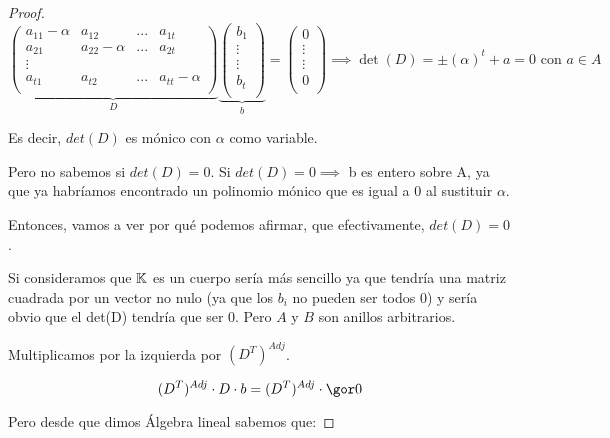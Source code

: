 \begin{proof}
	\[
	\underbrace{
	\left( \begin{array}{cccc}
	a_{11}-\alpha & a_{12} & ... & a_{1t} \\
	a_{21} & a_{22} -\alpha & ... & a_{2t} \\
	\vdots & & & \\
	a_{t1} & a_{t2}& ... & a_{tt} - \alpha \\
	\end{array}
	\right)}_{D}
	\underbrace{
	\left( \begin{array}{c}
	b_1 \\
	\vdots \\
	\vdots \\
	b_t\\
	\end{array}
	\right)}_{b} =
	\left( \begin{array}{c}
	0 \\
	\vdots\\
	\vdots \\
	0\\
	\end{array}
	\right) \implies \det(D)= \pm(\alpha)^t+ a=0 \text{ con } a \in A
	\]
	
	Es decir, $det(D)$ es mónico con $\alpha$ como variable.
	
	Pero no sabemos si $det(D)=0$. Si $det(D)=0 \implies$ b es entero sobre A, ya que ya habríamos encontrado un polinomio mónico que es igual a 0 al sustituir $\alpha$.
	
	Entonces, vamos a ver por qué podemos afirmar, que efectivamente, $det(D)=0$.
	
	Si consideramos que $\mathbb{K}$ es un cuerpo sería más sencillo ya que  tendría una matriz cuadrada por un vector no nulo (ya que los $b_i$ no pueden ser todos 0) y sería obvio que el det(D) tendría que ser 0. Pero $A$ y $B$ son anillos arbitrarios. 
	
	Multiplicamos por la izquierda por $ (D^T)^{Adj}$.
	
	$$ (D^T)^{Adj}\cdot D \cdot b = (D^T)^{Adj}\cdot \cls{0} $$
	
	Pero desde que dimos Álgebra lineal sabemos que:
	

\end{proof}
